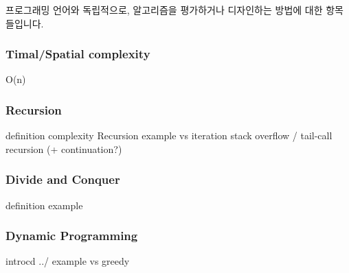 프로그래밍 언어와 독립적으로, 알고리즘을 평가하거나 디자인하는 방법에 대한 항목들입니다. 

\subsubsection{Timal/Spatial complexity} 

O(n)

\subsubsection{Recursion}

definition
complexity 
Recursion example 
vs iteration 
stack overflow / tail-call recursion (+ continuation?)


\subsubsection{Divide and Conquer}

definition
example 


\subsubsection{Dynamic Programming}

introcd ../
example
vs greedy 


\newpage



